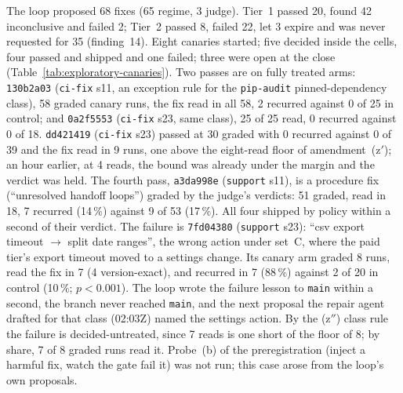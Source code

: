\documentclass[11pt]{article}
\newcommand{\code}[1]{\texttt{#1}}
\begin{document}
The loop proposed 68 fixes (65 regime, 3 judge). Tier~1 passed 20, found 42 inconclusive and
failed 2; Tier~2 passed 8, failed 22, let 3 expire and was never requested for 35 (finding~14).
Eight canaries started; five decided inside the cells, four passed and shipped and one failed;
three were open at the close (Table~\ref{tab:exploratory-canaries}). Two passes are on fully
treated arms: \code{130b2a03} (\code{ci-fix} s11, an exception rule for the \code{pip-audit}
pinned-dependency class), 58 graded canary runs, the fix read in all 58, 2 recurred against 0
of 25 in control; and \code{0a2f5553} (\code{ci-fix} s23, same class), 25 of 25 read, 0 recurred
against 0 of 18. \code{dd421419} (\code{ci-fix} s23) passed at 30 graded with 0 recurred against
0 of 39 and the fix read in 9 runs, one above the eight-read floor of amendment~(z$'$); an hour
earlier, at 4 reads, the bound was already under the margin and the verdict was held. The fourth
pass, \code{a3da998e} (\code{support} s11), is a procedure fix (``unresolved handoff loops'')
graded by the judge's verdicts: 51 graded, read in 18, 7 recurred (14\,\%) against 9 of 53
(17\,\%). All four shipped by policy within a second of their verdict. The failure is
\code{7fd04380} (\code{support} s23): ``csv export timeout $\to$ split date ranges'', the wrong
action under set~C, where the paid tier's export timeout moved to a settings change. Its canary
arm graded 8 runs, read the fix in 7 (4 version-exact), and recurred in 7 (88\,\%) against 2 of
20 in control (10\,\%; $p<0.001$). The loop wrote the failure lesson to \code{main} within a
second, the branch never reached \code{main}, and the next proposal the repair agent drafted for
that class (02:03Z) named the settings action. By the (z$''$) class rule the failure is
decided-untreated, since 7 reads is one short of the floor of 8; by share, 7 of 8 graded runs
read it. Probe~(b) of the preregistration (inject a harmful fix, watch the gate fail it) was not
run; this case arose from the loop's own proposals.
\end{document}

